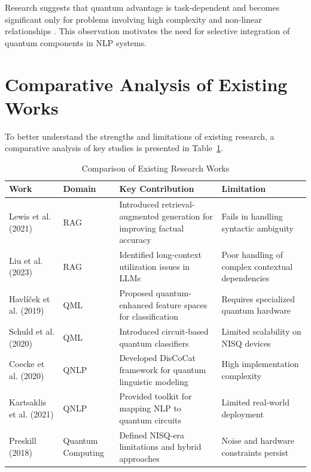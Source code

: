 Research suggests that quantum advantage is task-dependent and becomes significant only for problems involving high complexity and non-linear relationships \cite{schuld2021encoding}. This observation motivates the need for selective integration of quantum components in NLP systems.

\section{Comparative Analysis of Existing Works}

To better understand the strengths and limitations of existing research, a comparative analysis of key studies is presented in Table~\ref{tab:literature_comparison}.

\begin{table}[h]
    \centering
    \caption{Comparison of Existing Research Works}
    \label{tab:literature_comparison}
    \begin{tabular}{|p{3cm}|p{3cm}|p{4cm}|p{4cm}|}
        \hline
        \textbf{Work} & \textbf{Domain} & \textbf{Key Contribution} & \textbf{Limitation} \\
        \hline
        Lewis et al. (2021) \cite{lewis2021rag} & RAG & Introduced retrieval-augmented generation for improving factual accuracy & Fails in handling syntactic ambiguity \\
        \hline
        Liu et al. (2023) \cite{liu2023lostmiddle} & RAG & Identified long-context utilization issues in LLMs & Poor handling of complex contextual dependencies \\
        \hline
        Havlíček et al. (2019) \cite{havlicek2019quantum} & QML & Proposed quantum-enhanced feature spaces for classification & Requires specialized quantum hardware \\
        \hline
        Schuld et al. (2020) \cite{schuld2020circuit} & QML & Introduced circuit-based quantum classifiers & Limited scalability on NISQ devices \\
        \hline
        Coecke et al. (2020) \cite{coeke2020qnlp} & QNLP & Developed DisCoCat framework for quantum linguistic modeling & High implementation complexity \\
        \hline
        Kartsaklis et al. (2021) \cite{kartsaklis2021lambeq} & QNLP & Provided toolkit for mapping NLP to quantum circuits & Limited real-world deployment \\
        \hline
        Preskill (2018) \cite{preskill2018nisq} & Quantum Computing & Defined NISQ-era limitations and hybrid approaches & Noise and hardware constraints persist \\
        \hline
    \end{tabular}
\end{table}

